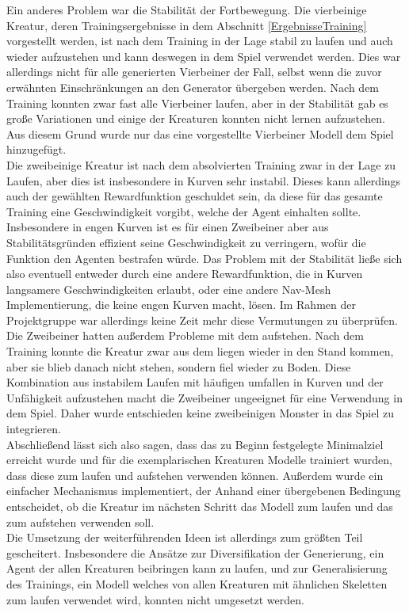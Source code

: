 Ein anderes Problem war die Stabilität der Fortbewegung. Die vierbeinige Kreatur, deren Trainingsergebnisse in dem Abschnitt \ref{ErgebnisseTraining} vorgestellt werden, ist nach dem Training in der Lage stabil zu laufen und auch wieder aufzustehen und kann deswegen in dem Spiel verwendet werden. 
Dies war allerdings nicht für alle generierten Vierbeiner der Fall, selbst wenn die zuvor erwähnten Einschränkungen an den Generator übergeben werden. Nach dem Training konnten zwar fast alle Vierbeiner laufen, aber in der Stabilität gab es große Variationen und einige der Kreaturen konnten nicht lernen aufzustehen. Aus diesem Grund wurde nur das eine vorgestellte Vierbeiner Modell dem Spiel hinzugefügt.\\
Die zweibeinige Kreatur ist nach dem absolvierten Training zwar in der Lage zu Laufen, aber dies ist insbesondere in Kurven sehr instabil. Dieses kann allerdings auch der gewählten Rewardfunktion geschuldet sein, da diese für das gesamte Training eine Geschwindigkeit vorgibt, welche der Agent einhalten sollte. Insbesondere in engen Kurven ist es für einen Zweibeiner aber aus Stabilitätsgründen effizient seine Geschwindigkeit zu verringern, wofür die Funktion den Agenten bestrafen würde. Das Problem mit der Stabilität ließe sich also eventuell entweder durch eine andere Rewardfunktion, die in Kurven langsamere Geschwindigkeiten erlaubt, oder eine andere Nav-Mesh Implementierung, die keine engen Kurven macht, lösen. Im Rahmen der Projektgruppe war allerdings keine Zeit mehr diese Vermutungen zu überprüfen.\\
Die Zweibeiner hatten außerdem Probleme mit dem aufstehen. Nach dem Training konnte die Kreatur zwar aus dem liegen wieder in den Stand kommen, aber sie blieb danach nicht stehen, sondern fiel wieder zu Boden. Diese Kombination aus instabilem Laufen mit häufigen umfallen in Kurven und der Unfähigkeit aufzustehen macht die Zweibeiner ungeeignet für eine Verwendung in dem Spiel. Daher wurde entschieden keine zweibeinigen Monster in das Spiel zu integrieren. \\

Abschließend lässt sich also sagen, dass das zu Beginn festgelegte Minimalziel erreicht wurde und für die exemplarischen Kreaturen Modelle trainiert wurden, dass diese zum laufen und aufstehen verwenden können. Außerdem wurde ein einfacher Mechanismus implementiert, der Anhand einer übergebenen Bedingung entscheidet, ob die Kreatur im nächsten Schritt das Modell zum laufen und das zum aufstehen verwenden soll. \\
Die Umsetzung der weiterführenden Ideen ist allerdings zum größten Teil gescheitert. 
Insbesondere die Ansätze zur Diversifikation der Generierung, ein Agent der allen Kreaturen beibringen kann zu laufen, und zur Generalisierung des Trainings, ein Modell welches von allen Kreaturen mit ähnlichen Skeletten zum laufen verwendet wird, konnten nicht umgesetzt werden.
